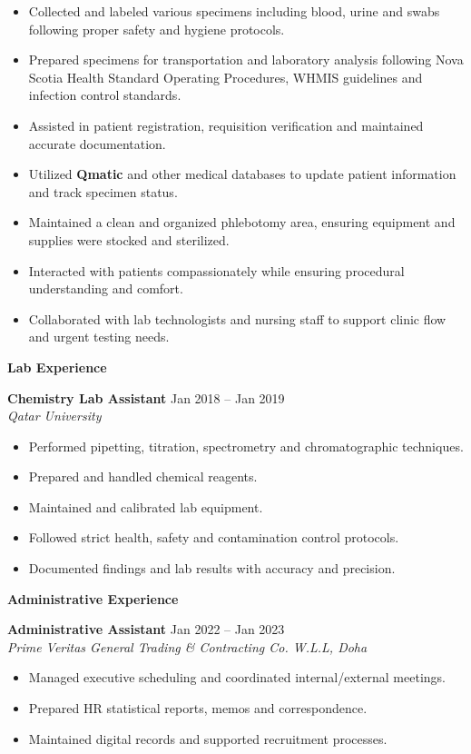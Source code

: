 \documentclass[11pt]{article} %
\newcommand{\cvsection}[1] {
  \begin{center}
    \large\textbf{#1}
  \end{center}
}
\begin{document}
\begin{itemize}
  \setlength\itemsep{-1mm}
\item Collected and labeled various specimens including blood, urine and swabs following proper safety and hygiene protocols.

\item Prepared specimens for transportation and laboratory analysis following Nova Scotia Health Standard Operating Procedures, WHMIS guidelines and infection control standards.

\item Assisted in patient registration, requisition verification and maintained accurate documentation.

\item Utilized \textbf{Qmatic} and other medical databases to update patient information and track specimen status.

\item Maintained a clean and organized phlebotomy area, ensuring equipment and supplies were stocked and sterilized.

\item Interacted with patients compassionately while ensuring procedural understanding and comfort.

\item Collaborated with lab technologists and nursing staff to support clinic flow and urgent testing needs.
\end{itemize}

\cvsection{Lab Experience}
\textbf{Chemistry Lab Assistant} \hfill Jan 2018 -- Jan 2019\\
\emph{Qatar University}
\begin{itemize}
  \setlength\itemsep{-1mm}
\item Performed pipetting, titration, spectrometry and chromatographic techniques.
\item Prepared and handled chemical reagents.
\item Maintained and calibrated lab equipment.
\item Followed strict health, safety and contamination control protocols.
\item Documented findings and lab results with accuracy and precision.
\end{itemize}


\cvsection{Administrative Experience}
\textbf{Administrative Assistant} \hfill Jan 2022 -- Jan 2023 \\
\emph{Prime Veritas General Trading \& Contracting Co. W.L.L, Doha}
\begin{itemize}
  \setlength\itemsep{-1mm}
\item Managed executive scheduling and coordinated internal/external meetings.
\item Prepared HR statistical reports, memos and correspondence.
\item Maintained digital records and supported recruitment processes.
\end{itemize}
\end{document}
